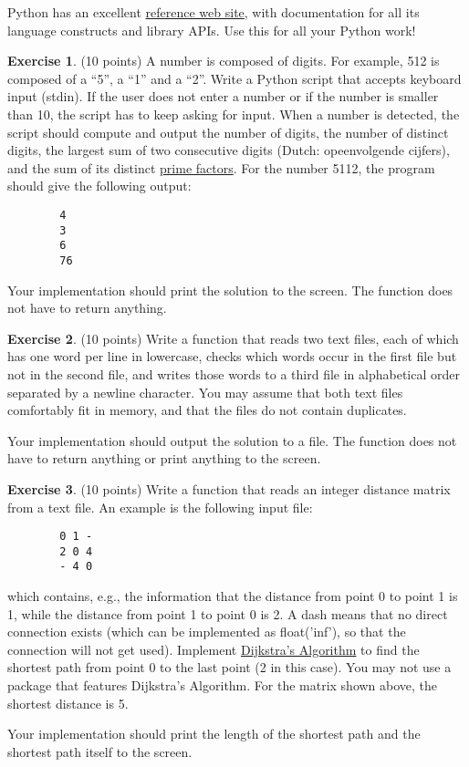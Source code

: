 \documentclass[a4paper]{report}
\theoremstyle{definition}
\newtheorem{exercise}{Exercise}
\begin{document}
	\noindent Python has an excellent \href{https://docs.python.org/3/}{reference web site}, with documentation for all its language
	constructs and library APIs. Use this for all your Python work!
	
	\begin{exercise}
		(10 points) A number is composed of digits. For example, 512 is composed of a “5”, a “1” and  a “2”. Write a Python script that accepts keyboard input (stdin). If the user does not enter a number or if the number is smaller than 10, the script has to keep asking for input. When a number is detected, the script should compute and output the number of digits, the number of distinct digits, the largest sum of two consecutive digits  (Dutch: opeenvolgende cijfers), and the sum of its distinct \href{https://en.wikipedia.org/wiki/Prime_factor}{prime factors}. For the number 5112, the program should give the following output:
		
		\begin{verbatim}
		4
		3
		6
		76
		\end{verbatim}
		
		\noindent Your implementation should print the solution to the screen. The function does not have to return anything.
	\end{exercise}
	
	\begin{exercise}
		(10 points) Write a function that reads two text files, each of which has one word per line in lowercase, checks which words occur in
		the first file but not in the second file, and writes those words to a third file in alphabetical order separated by a newline character. You	may assume that both text files comfortably fit in memory, and that the	files do not contain duplicates.
		
		Your implementation should output the solution to a file. The function does not have to return anything or print anything to the screen.	
	\end{exercise}
	
	\begin{exercise}
		(10 points) Write a function that reads an integer distance matrix from a text file. An example is the following input file:
		
		\begin{verbatim}
		0 1 -
		2 0 4
		- 4 0
		\end{verbatim}
		
		\noindent which contains, e.g., the information that the distance from point 0 to point 1 is 1, while the distance from point 1 to point 0 is 2. A dash means that no direct connection exists (which can be implemented as float('inf'), so that the connection will not get used). Implement \href{https://en.wikipedia.org/wiki/Dijkstra's_algorithm\#Pseudocode}{Dijkstra's Algorithm} to find the shortest path from point 0 to the last point (2 in this case). You may not use a package that features Dijkstra’s Algorithm. For the matrix shown above, the shortest distance is 5.
		
		Your implementation should print the length of the shortest path and the shortest path itself to the screen.
	\end{exercise}
	
\end{document}
